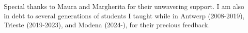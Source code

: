 

Special thanks to Maura and Margherita for their unwavering support. I am also in debt to several generations of students I taught while in Antwerp (2008-2019), Trieste (2019-2023), and Modena (2024-), for their precious feedback.
